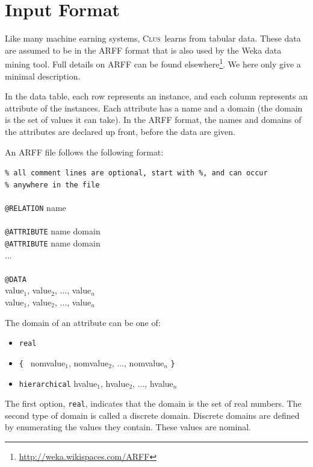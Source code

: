 \documentclass[a4paper]{report}
\newcommand{\clus}{\textsc{Clus}}
\begin{document}
\chapter{Input Format}
\label{ch:data}

Like many machine earning systems, \clus\ learns from tabular data. These data are assumed to be in the ARFF format that is also used by the Weka data mining tool.  Full details on ARFF can be found elsewhere\footnote{\url{http://weka.wikispaces.com/ARFF}}. We here only give a minimal description.

In the data table, each row represents an instance, and each column represents an attribute of the instances.  Each attribute has a name and a domain (the domain is the set of values it can take).  In the ARFF format, the names and domains of the attributes are declared up front, before the data are given.

An ARFF file follows the following format:

\begin{tabbing}
{\tt \% all comment lines are optional, start with \%, and can occur }\\
{\tt \% anywhere in the file}\\
\\
{\tt @RELATION} name\\
\\
{\tt @ATTRIBUTE} name domain\\
{\tt @ATTRIBUTE} name domain\\
...\\
\\
{\tt @DATA}\\
value$_1$, value$_2$, ..., value$_n$\\
value$_1$, value$_2$, ..., value$_n$\\
\end{tabbing}

The domain of an attribute can be one of:
\begin{itemize}
	\item\tt real
	\item{\tt \{ } nomvalue$_1$, nomvalue$_2$, ..., nomvalue$_n$ {\tt \} }
	\item{\tt hierarchical} hvalue$_1$, hvalue$_2$, ..., hvalue$_n$
\end{itemize}

The first option, {\tt real}, indicates that the domain is the set of real numbers. The second type of domain is called a discrete domain.  Discrete domains are defined by enumerating the values they contain.  These values are nominal.
\end{document}
